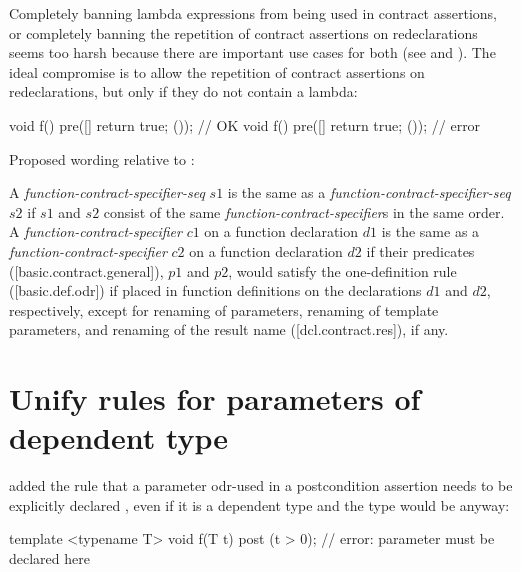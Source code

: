 Completely banning lambda expressions from being used in contract assertions, or completely banning the repetition of contract assertions on redeclarations seems too harsh because there are important use cases for both (see \cite{P2890R2} and \cite{P3066R0}). The ideal compromise is to allow the repetition of contract assertions on redeclarations, but only if they do not contain a lambda:

\begin{codeblock}
void f() pre([]{ return true; }());  // OK
void f() pre([]{ return true; }());  // error
\end{codeblock}

Proposed wording relative to \cite{P2900R11}:

\begin{adjustwidth}{0.5cm}{0.5cm}
A \emph{function-contract-specifier-seq} $s1$ is the same as a \emph{function-contract-specifier-seq} $s2$ if $s1$ and $s2$ consist of the same \emph{function-contract-specifier}s in the same order. A  \emph{function-contract-specifier} $c1$ on a function declaration $d1$ is the same as a \emph{function-contract-specifier} $c2$ on a function declaration $d2$ if their predicates ([basic.contract.general]), $p1$ and $p2$, would satisfy the one-definition rule ([basic.def.odr]) if placed in function definitions on the declarations $d1$ and $d2$, respectively, except for renaming of parameters, renaming of template parameters, and renaming of the result name ([dcl.contract.res]), if any. 

\end{adjustwidth}

\section{Unify rules for parameters of dependent type}

\cite{P3489R0} added the rule that a parameter odr-used in a postcondition assertion needs to be explicitly declared , even if it is a dependent type and the type would be  anyway:

\begin{codeblock}
template <typename T>
void f(T t) post (t > 0);  // error: parameter must be declared  here
\end{codeblock}

